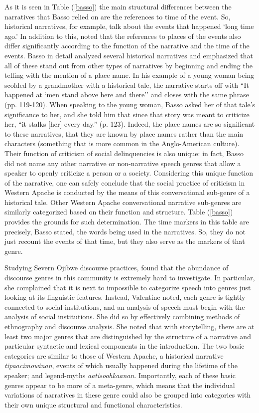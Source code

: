 \documentclass[12pt]{article}
\begin{document}
As it is seen in Table (\ref{basso}) the main structural differences between the narratives that Basso relied on are the references to time of the event. So, historical narratives, for example, talk about the events that happened `long time ago.' In addition to this, \textcite{basso1990} noted that the references to places of the events also differ significantly  according to the function of the narrative and the time of the events. Basso in detail analyzed several historical narratives and emphasized that all of these stand out from other types of narratives by beginning and ending the telling with the mention of a place name. In his example of a young woman being scolded by a grandmother with a historical tale, the narrative starts off with ``It happened at `men stand above here and there'' and closes with the same phrase (pp. 119-120). When speaking to the young woman, Basso asked her of that tale's significance  to her, and she told him that since that story was meant to criticize her, ``it stalks [her] every day.'' (p. 123). Indeed, the place names are so significant to these narratives, that they are known by place names rather than the main characters (something that is more common in the Anglo-American culture). Their function of criticism of social delinquencies is also unique: in fact, Basso did not name any other narrative or non-narrative speech genres that allow a speaker to openly criticize a person or a society. Considering this unique function of the narrative, one can safely conclude that the social practice of criticism in Western Apache is conducted by the means of this conversational sub-genre of a historical tale. Other Western Apache conversational narrative sub-genres are similarly categorized based on their function and structure. Table (\ref{basso}) provides the grounds for such determination. The time markers in this table are precisely, Basso stated, the words being used in the narratives. So, they do not just recount the events of that time, but they also serve as the markers of that genre. 
			
Studying Severn Ojibwe discourse practices, \textcite{valentine1995} found that the abundance of discourse genres in this community is extremely hard to investigate. In particular, she complained that it is next to impossible to categorize speech into genres just looking at its linguistic features. Instead, Valentine noted, each genre is tightly connected to  social institutions, and an analysis of speech must begin with the analysis of social institutions. She did so by effectively combining methods of ethnography and discourse analysis. She noted that with storytelling, there are at least two major genres that are distinguished by the structure of a narrative and particular syntactic and lexical components in the introduction. The two basic categories are similar to those of Western Apache, a historical narrative \textit{tipaacimowinan}, events of which usually happened during the lifetime of the speaker; and legend-myths \textit{aatisoohkaanan}. Importantly, each of these basic genres appear to be more of a meta-genre, which means that the individual variations of narratives in these genre could also be grouped into categories with their own unique structural and functional characteristics.
\end{document}
